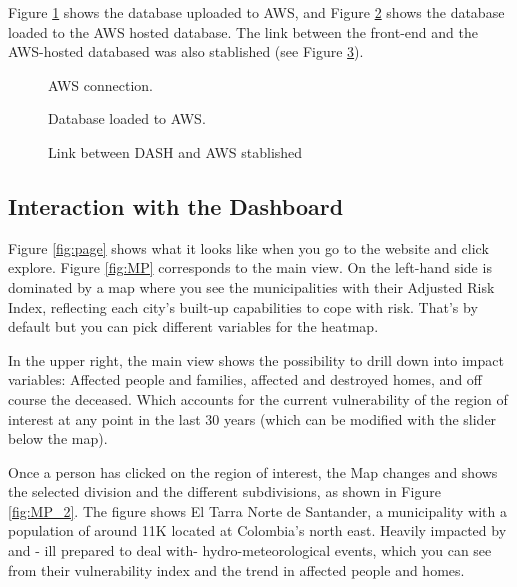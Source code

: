 Figure \ref{fig:awsConnection} shows the database uploaded to AWS, and Figure \ref{fig:databaseLoaded} shows the database loaded to the AWS hosted database. The link between the front-end and the AWS-hosted databased was also stablished (see Figure \ref{fig:linkDASH_AWS}). 


\begin{figure}[!htb]
\caption{AWS connection.}
\label{fig:awsConnection}
\end{figure}




\begin{figure}[!htb]
\caption{Database loaded to AWS.}
\label{fig:databaseLoaded}
\end{figure}



\begin{figure}[!htb]
\caption{Link between DASH and AWS stablished}
\label{fig:linkDASH_AWS}
\end{figure}




\subsection{Interaction with the Dashboard}

Figure \ref{fig:page} shows what it looks like when you go to the website and click explore. Figure \ref{fig:MP} corresponds to the main view. On the left-hand side is dominated by a map where you see the municipalities with their Adjusted Risk Index, reflecting each city's built-up capabilities to cope with risk. That's by default but you can pick different variables for the heatmap.

In the upper right, the main view shows the possibility to drill down into impact variables: Affected people and families, affected and destroyed homes, and off course the deceased. Which accounts for the current vulnerability of the region of interest at any point in the last 30 years (which can be modified with the slider below the map).

Once a person has clicked on the region of interest, the Map changes and shows the selected division and the different subdivisions, as shown in Figure \ref{fig:MP_2}. The figure shows El Tarra Norte de Santander, a municipality with a population of around 11K located at Colombia's north east. Heavily impacted by and - ill prepared to deal with- hydro-meteorological events, which you can see from their vulnerability index and the trend in affected people and homes. 

